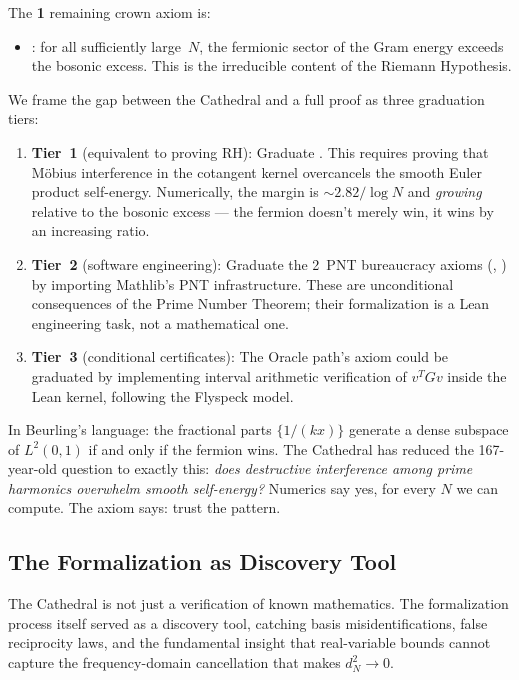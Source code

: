 \documentclass[11pt,a4paper]{article}
\begin{document}
The \textbf{1} remaining crown axiom is:
\begin{itemize}
  \item {}: for all sufficiently
    large~$N$, the fermionic sector of the Gram energy exceeds
    the bosonic excess. This is the irreducible content of the
    Riemann Hypothesis.
\end{itemize}

\noindent
We frame the gap between the Cathedral and a full proof as three
graduation tiers:

\begin{enumerate}
  \item \textbf{Tier~1} (equivalent to proving RH):
    Graduate .
    This requires proving that M\"obius interference in the cotangent
    kernel overcancels the smooth Euler product self-energy.
    Numerically, the margin is $\sim 2.82/\log N$ and
    \emph{growing} relative to the bosonic excess --- the fermion
    doesn't merely win, it wins by an increasing ratio.
  \item \textbf{Tier~2} (software engineering):
    Graduate the 2~PNT bureaucracy axioms
    (, )
    by importing Mathlib's PNT infrastructure. These are unconditional
    consequences of the Prime Number Theorem; their formalization is
    a Lean engineering task, not a mathematical one.
  \item \textbf{Tier~3} (conditional certificates):
    The Oracle path's  axiom could be
    graduated by implementing interval arithmetic verification of
    $v^T G v$ inside the Lean kernel, following the Flyspeck model.
\end{enumerate}

\noindent
In Beurling's language: the fractional parts $\{1/(kx)\}$ generate
a dense subspace of $L^2(0,1)$ if and only if the fermion wins.
The Cathedral has reduced the 167-year-old question to exactly this:
\emph{does destructive interference among prime harmonics overwhelm
smooth self-energy?} Numerics say yes, for every $N$ we can compute.
The axiom says: trust the pattern.

\subsection{The Formalization as Discovery Tool}

The Cathedral is not just a verification of known mathematics. The
formalization process itself served as a discovery tool, catching
basis misidentifications, false reciprocity laws, and the fundamental
insight that real-variable bounds cannot capture the frequency-domain
cancellation that makes $d_N^2 \to 0$.
\end{document}
